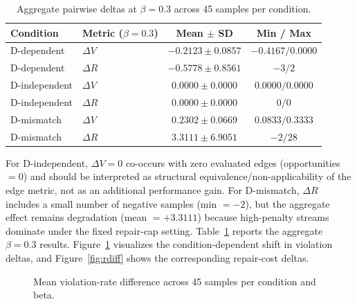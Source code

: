 \documentclass[11pt,a4paper]{article}
\begin{document}
\begin{table}[t]
\centering
\caption{Aggregate pairwise deltas at \(\beta=0.3\) across 45 samples per condition.}
\label{tab:main_results}
\begin{tabular}{@{}llcc@{}}
\toprule
Condition & Metric (\(\beta=0.3\)) & Mean $\pm$ SD & Min / Max \\
\midrule
D-dependent & $\Delta V$ & $-0.2123 \pm 0.0857$ & $-0.4167 / 0.0000$ \\
D-dependent & $\Delta R$ & $-0.5778 \pm 0.8561$ & $-3 / 2$ \\
D-independent & $\Delta V$ & $0.0000 \pm 0.0000$ & $0.0000 / 0.0000$ \\
D-independent & $\Delta R$ & $0.0000 \pm 0.0000$ & $0 / 0$ \\
D-mismatch & $\Delta V$ & $0.2302 \pm 0.0669$ & $0.0833 / 0.3333$ \\
D-mismatch & $\Delta R$ & $3.3111 \pm 6.9051$ & $-2 / 28$ \\
\bottomrule
\end{tabular}
\end{table}
For D-independent, \(\Delta V=0\) co-occurs with zero evaluated edges (opportunities \(=0\)) and should be interpreted as structural equivalence/non-applicability of the edge metric, not as an additional performance gain.
For D-mismatch, \(\Delta R\) includes a small number of negative samples (min \(=-2\)), but the aggregate effect remains degradation (mean \(=+3.3111\)) because high-penalty streams dominate under the fixed repair-cap setting.
Table~\ref{tab:main_results} reports the aggregate \(\beta=0.3\) results. Figure~\ref{fig:vdiff} visualizes the condition-dependent shift in violation deltas, and Figure~\ref{fig:rdiff} shows the corresponding repair-cost deltas.

\begin{figure}[t]
\centering
{}
\caption{Mean violation-rate difference across 45 samples per condition and beta.}
\label{fig:vdiff}
\end{figure}
\end{document}
